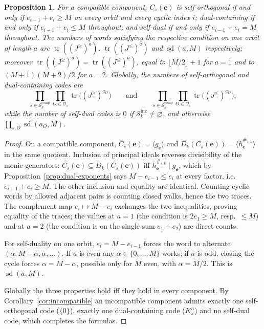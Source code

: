 \documentclass[11pt,a4paper]{article}
\newcommand{\Os}{\mathcal O_s}
\newcommand{\Dk}{D_k}
\numberwithin{equation}{section}
\theoremstyle{plain}
\newtheorem{proposition}[theorem]{Proposition}
\theoremstyle{definition}
\theoremstyle{remark}
\begin{document}
\begin{proposition}\label{prop:extremal-counts}
For a compatible component, $C_s(\mathbf{e})$ is self-orthogonal if and only
if $e_{i-1}+e_i\geq M$ on \emph{every} orbit and every cyclic index $i$;
dual-containing if and only if $e_{i-1}+e_i\leq M$ throughout; and self-dual
if and only if $e_{i-1}+e_i=M$ throughout.  The numbers of words satisfying
the respective condition on one orbit of length $a$ are
$\operatorname{tr}((J^{\geq})^a)$, $\operatorname{tr}((J^{\leq})^a)$ and
$\operatorname{sd}(a,M)$ respectively; moreover
$\operatorname{tr}((J^{\geq})^a)=\operatorname{tr}((J^{\leq})^a)$, equal to
$\lfloor M/2\rfloor+1$ for $a=1$ and to $(M+1)(M+2)/2$ for $a=2$.
Globally, the numbers of self-orthogonal and dual-containing codes are
\[
\prod_{s\in\mathcal{S}_k^{\mathrm{comp}}}\prod_{O\in\Os}
 \operatorname{tr}\bigl((J^{\geq})^{a_O}\bigr)
\qquad\text{and}\qquad
\prod_{s\in\mathcal{S}_k^{\mathrm{comp}}}\prod_{O\in\Os}
 \operatorname{tr}\bigl((J^{\leq})^{a_O}\bigr),
\]
while the number of self-dual codes is $0$ if
$\mathcal{S}_k^{\mathrm{inc}}\neq\varnothing$, and otherwise
$\prod_{s,O}\operatorname{sd}(a_O,M)$.
\end{proposition}

\begin{proof}
On a compatible component, $C_s(\mathbf{e})=\langle g_{\mathbf{e}}\rangle$ and
$\Dk(C_s(\mathbf{e}))=\langle h_{\mathbf{e}}^{\#_{s,k}}\rangle$ in the same
quotient.  Inclusion of principal ideals reverses divisibility of the monic
generators: $C_s(\mathbf{e})\subseteq\Dk(C_s(\mathbf{e}))$ iff
$h_{\mathbf{e}}^{\#_{s,k}}\mid g_{\mathbf{e}}$, which by
Proposition~\ref{prop:dual-exponents} says $M-e_{i-1}\leq e_i$ at every factor,
i.e.\ $e_{i-1}+e_i\geq M$.  The other inclusion and equality are identical.
Counting cyclic words by allowed adjacent pairs is counting closed walks,
hence the two traces.  The complement map $e_i\mapsto M-e_i$ exchanges the two
inequalities, proving equality of the traces; the values at $a=1$ (the
condition is $2e_1\geq M$, resp.\ $\leq M$) and at $a=2$ (the condition is on
the single sum $e_1+e_2$) are direct counts.

For self-duality on one orbit, $e_i=M-e_{i-1}$ forces the word to alternate
$(\alpha,M-\alpha,\alpha,\ldots)$.  If $a$ is even any
$\alpha\in\{0,\ldots,M\}$ works; if $a$ is odd, closing the cycle forces
$\alpha=M-\alpha$, possible only for $M$ even, with $\alpha=M/2$.  This is
$\operatorname{sd}(a,M)$.

Globally the three properties hold iff they hold in every component.  By
Corollary~\ref{cor:incompatible} an incompatible component admits exactly one
self-orthogonal code ($\{0\}$), exactly one dual-containing code ($K_s^n$) and
no self-dual code, which completes the formulas.
\end{proof}
\end{document}
